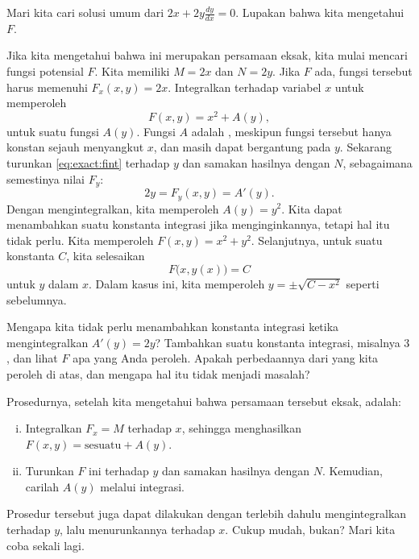 \begin{example}
Mari kita cari solusi umum dari
$2x + 2y \frac{dy}{dx} = 0$.  Lupakan bahwa kita mengetahui
$F$.

Jika kita mengetahui bahwa ini merupakan persamaan eksak, kita mulai mencari fungsi
potensial $F$.
Kita memiliki $M = 2x$ dan $N=2y$.
Jika $F$ ada, fungsi tersebut harus memenuhi
$F_x (x,y) = 2x$.
Integralkan terhadap variabel $x$ untuk memperoleh
\begin{equation} \label{eq:exact:fint}
F(x,y) = x^2 + A(y) ,
\end{equation}
untuk suatu fungsi $A(y)$.  Fungsi $A$ adalah , meskipun fungsi tersebut hanya konstan sejauh menyangkut $x$, dan
masih dapat bergantung pada $y$.  Sekarang turunkan \eqref{eq:exact:fint} terhadap $y$
dan samakan hasilnya dengan $N$, sebagaimana semestinya nilai $F_y$:
\begin{equation*}
2y = F_y (x,y) = A'(y) .
\end{equation*}
Dengan mengintegralkan, kita memperoleh $A(y) = y^2$.  Kita dapat menambahkan suatu konstanta integrasi
jika menginginkannya, tetapi hal itu tidak perlu.  Kita memperoleh $F(x,y) = x^2+y^2$.
Selanjutnya, untuk suatu konstanta $C$, kita selesaikan
\begin{equation*}
F\bigl(x,y(x)\bigr) = C
\end{equation*}
untuk $y$ dalam $x$.  Dalam kasus ini, kita memperoleh $y = \pm \sqrt{C-x^2}$
seperti sebelumnya.
\end{example}

\begin{exercise}
Mengapa kita tidak perlu menambahkan konstanta integrasi ketika mengintegralkan $A'(y)
= 2y$?  Tambahkan suatu konstanta integrasi, misalnya $3$, dan lihat $F$ apa yang Anda peroleh.
Apakah perbedaannya dari yang kita peroleh di atas, dan mengapa hal itu tidak menjadi masalah?
\end{exercise}



Prosedurnya, setelah kita mengetahui bahwa persamaan tersebut eksak, adalah:
\begin{enumerate}[(i)]
\item Integralkan $F_x = M$ terhadap $x$, sehingga menghasilkan $F(x,y) = \text{sesuatu} + A(y)$.
\item Turunkan $F$ ini terhadap $y$ dan samakan hasilnya dengan
$N$.   Kemudian, carilah $A(y)$ melalui integrasi.
\end{enumerate}
Prosedur tersebut juga dapat dilakukan dengan terlebih dahulu mengintegralkan terhadap $y$, lalu
menurunkannya terhadap $x$.
Cukup mudah, bukan?  Mari kita coba sekali lagi.

